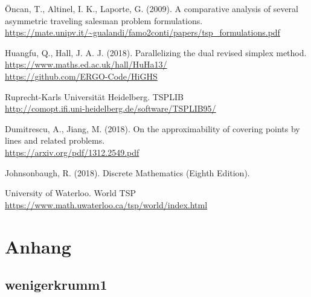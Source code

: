 \documentclass[a4paper, 10pt, ngerman]{article}
\begin{document}
\begin{thebibliography}{4}
    Öncan, T., Altinel, I. K., Laporte, G. (2009).
    A comparative analysis of several asymmetric traveling salesman problem formulations. \\
    \href{https://mate.unipv.it/gualandi/famo2conti/papers/tsp_formulations.pdf}{https://mate.unipv.it/\textasciitilde{}gualandi/famo2conti/papers/tsp\_formulations.pdf}
    
    Huangfu, Q., Hall, J. A. J. (2018).
    Parallelizing the dual revised simplex method. \\
    \href{https://www.maths.ed.ac.uk/hall/HuHa13/}{https://www.maths.ed.ac.uk/hall/HuHa13/} \\
    \href{https://github.com/ERGO-Code/HiGHS}{https://github.com/ERGO-Code/HiGHS}

    Ruprecht-Karls Universität Heidelberg. TSPLIB \\
    \href{http://comopt.ifi.uni-heidelberg.de/software/TSPLIB95/}{http://comopt.ifi.uni-heidelberg.de/software/TSPLIB95/}

    Dumitrescu, A., Jiang, M. (2018).
    On the approximability of covering points by lines and related problems. \\
    \href{https://arxiv.org/pdf/1312.2549.pdf}{https://arxiv.org/pdf/1312.2549.pdf}

    Johnsonbaugh, R. (2018). 
    Discrete Mathematics (Eighth Edition).

    University of Waterloo. World TSP \\
    \href{https://www.math.uwaterloo.ca/tsp/world/index.html}{https://www.math.uwaterloo.ca/tsp/world/index.html}
\end{thebibliography}

\section*{Anhang}

\subsection*{wenigerkrumm1}
\end{document}
